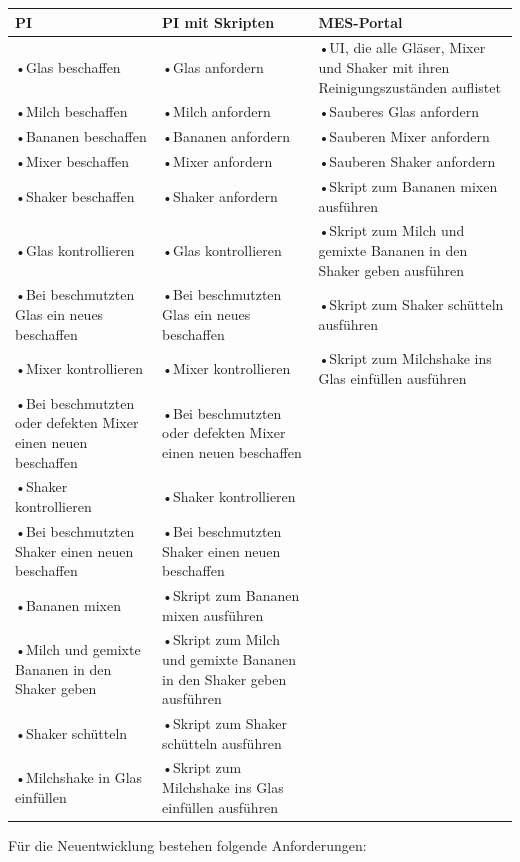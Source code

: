 \documentclass[ngerman]{article}
\begin{document}
    \begin{tabularx}{\textwidth}{|X|X|X|}
        \hline
        PI&PI mit Skripten&MES-Portal\\
        \hline
        •Glas beschaffen&•Glas anfordern&•UI, die alle Gläser, Mixer und Shaker mit ihren Reinigungszuständen auflistet\\
        •Milch beschaffen&•Milch anfordern&•Sauberes Glas anfordern\\
        •Bananen beschaffen&•Bananen anfordern&•Sauberen Mixer anfordern\\
        •Mixer beschaffen&•Mixer anfordern&•Sauberen Shaker anfordern\\
        •Shaker beschaffen&•Shaker anfordern&•Skript zum Bananen mixen ausführen\\
        •Glas kontrollieren&•Glas kontrollieren&•Skript zum Milch und gemixte Bananen in den Shaker geben ausführen\\
        •Bei beschmutzten Glas ein neues beschaffen&•Bei beschmutzten Glas ein neues beschaffen&•Skript zum Shaker schütteln ausführen\\
        •Mixer kontrollieren&•Mixer kontrollieren&•Skript zum Milchshake ins Glas einfüllen ausführen\\
        •Bei beschmutzten oder defekten Mixer einen neuen beschaffen&•Bei beschmutzten oder defekten Mixer einen neuen beschaffen&\\
        •Shaker kontrollieren&•Shaker kontrollieren&\\
        •Bei beschmutzten Shaker einen neuen beschaffen&•Bei beschmutzten Shaker einen neuen beschaffen&\\
        •Bananen mixen&•Skript zum Bananen mixen ausführen&\\
        •Milch und gemixte Bananen in den Shaker geben&•Skript zum Milch und gemixte Bananen in den Shaker geben ausführen&\\
        •Shaker schütteln&•Skript zum Shaker schütteln ausführen&\\
        •Milchshake in Glas einfüllen&•Skript zum Milchshake ins Glas einfüllen ausführen&\\
        \hline
    \end{tabularx}\newpage
    Für die Neuentwicklung bestehen folgende Anforderungen:
\end{document}
